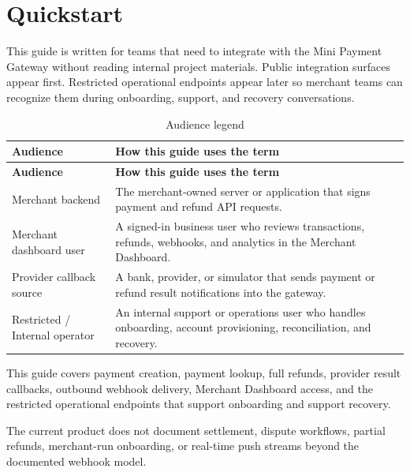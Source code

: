 \section{Quickstart}

This guide is written for teams that need to integrate with the Mini Payment
Gateway without reading internal project materials. Public integration surfaces
appear first. Restricted operational endpoints appear later so merchant teams
can recognize them during onboarding, support, and recovery conversations.


\begin{longtable}{@{}L{0.24\textwidth}L{0.68\textwidth}@{}}
\caption{Audience legend}\\
\toprule
\textbf{Audience} & \textbf{How this guide uses the term} \\
\midrule
\endfirsthead
\toprule
\textbf{Audience} & \textbf{How this guide uses the term} \\
\midrule
\endhead
Merchant backend & The merchant-owned server or application that signs payment
and refund API requests. \\
\bodyrowrule
Merchant dashboard user & A signed-in business user who reviews transactions,
refunds, webhooks, and analytics in the Merchant Dashboard. \\
\bodyrowrule
Provider callback source & A bank, provider, or simulator that sends payment or
refund result notifications into the gateway. \\
\bodyrowrule
Restricted / Internal operator & An internal support or operations user who
handles onboarding, account provisioning, reconciliation, and recovery. \\
\bottomrule
\end{longtable}

This guide covers payment creation, payment lookup, full refunds, provider
result callbacks, outbound webhook delivery, Merchant Dashboard access, and the
restricted operational endpoints that support onboarding and support recovery.

The current product does not document settlement, dispute workflows, partial
refunds, merchant-run onboarding, or real-time push streams beyond the
documented webhook model.
